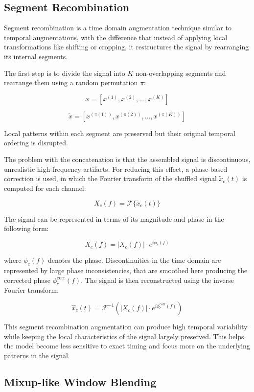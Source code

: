 \subsection{Segment Recombination}

Segment recombination is a time domain augmentation technique similar to temporal augmentations, with the difference that instead of applying local transformations like shifting or cropping, it restructures the signal by rearranging its internal segments.

The first step is to divide the signal into $K$ non-overlapping segments and rearrange them using a random permutation $\pi$: 

\[
x = \left[ x^{(1)}, x^{(2)}, \dots, x^{(K)} \right]
\]

\[
\tilde{x} = \left[ x^{(\pi(1))}, x^{(\pi(2))}, \dots, x^{(\pi(K))} \right]
\]

Local patterns within each segment are preserved but their original temporal ordering is disrupted. 

The problem with the concatenation is that the assembled signal is discontinuous, unrealistic high-frequency artifacts. For reducing this effect, a phase-based correction is used, in which the Fourier transform of the shuffled signal $\tilde{x}_c(t)$ is computed for each channel:

\[
X_c(f) = \mathcal{F}\{\tilde{x}_c(t)\}
\]

The signal can be represented in terms of its magnitude and phase in the following form:

\[
X_c(f) = \lvert X_c(f) \rvert \cdot e^{i \phi_c(f)}
\]

where $\phi_c(f)$ denotes the phase. 
Discontinuities in the time domain are represented by large phase inconsistencies, that are smoothed here producing the corrected phase $\phi_c^{\text{corr}}(f)$. The signal is then reconstructed using the inverse Fourier transform:

\[
\hat{x}_c(t) = \mathcal{F}^{-1} \left( |X_c(f)| \cdot e^{i \phi_c^{\text{corr}}(f)} \right)
\]

This segment recombination augmentation can produce high temporal variability while keeping the local characteristics of the signal largely preserved. This helps the model become less sensitive to exact timing and focus more on the underlying patterns in the signal.

\subsection{Mixup-like Window Blending}

